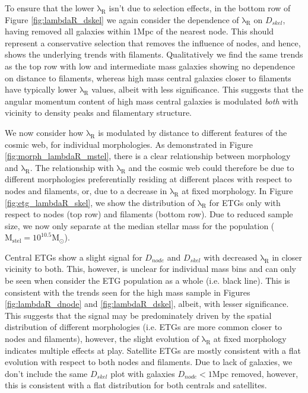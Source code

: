 To ensure that the lower $\mathrm{\lambda_R}$ isn't due to selection effects, in the bottom row of Figure \ref{fig:lambdaR_dskel} we again consider the dependence of $\mathrm{\lambda_R}$ on $D_{skel}$, having removed all galaxies within 1Mpc of the nearest node. This should represent a conservative selection that removes the influence of nodes, and hence, shows the underlying trends with filaments. Qualitatively we find the same trends as the top row with low and intermediate mass galaxies showing no dependence on distance to filaments, whereas high mass central galaxies closer to filaments have typically lower $\mathrm{\lambda_R}$ values, albeit with less significance. This suggests that the angular momentum content of high mass central galaxies is modulated \textit{both} with vicinity to density peaks and filamentary structure. 

We now consider how $\mathrm{\lambda_R}$ is modulated by distance to different features of the cosmic web, for individual morphologies. As demonstrated in Figure \ref{fig:morph_lambdaR_mstel}, there is a clear relationship between morphology and $\mathrm{\lambda_R}$. The relationship with $\mathrm{\lambda_R}$ and the cosmic web could therefore be due to different morphologies preferentially residing at different places with respect to nodes and filaments, or, due to a decrease in $\mathrm{\lambda_R}$ at fixed morphology. In Figure \ref{fig:etg_lambdaR_skel}, we show the distribution of $\mathrm{\lambda_R}$ for ETGs only with respect to nodes (top row) and filaments (bottom row). Due to reduced sample size, we now only separate at the median stellar mass for the population ($\mathrm{M_{stel} = 10^{10.5}M_{\odot}}$). 

Central ETGs show a slight signal for $D_{node}$ and $D_{skel}$ with decreased $\mathrm{\lambda_R}$ in closer vicinity to both. This, however, is unclear for individual mass bins and can only be seen when consider the ETG population as a whole (i.e. black line). This is consistent with the trends seen for the high mass sample in Figures \ref{fig:lambdaR_dnode} and \ref{fig:lambdaR_dskel}, albeit, with lesser significance. This suggests that the signal may be predominately driven by the spatial distribution of different morphologies (i.e. ETGs are more common closer to nodes and filaments), however, the slight evolution of $\mathrm{\lambda_R}$ at fixed morphology indicates multiple effects at play. Satellite ETGs are mostly consistent with a flat evolution with respect to both nodes and filaments. Due to lack of galaxies, we don't include the same $D_{skel}$ plot with galaxies $D_{node} < 1$Mpc removed, however, this is consistent with a flat distribution for both centrals and satellites.


